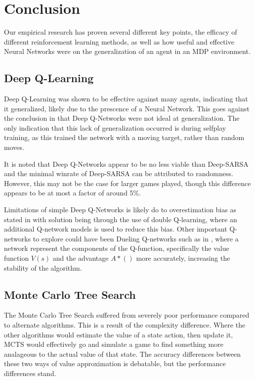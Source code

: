 \section{Conclusion}
Our empirical research has proven several different key points, the efficacy of different reinforcement learning methods, as well as how useful and effective Neural Networks were on the generalization of an agent in an MDP environment.
\subsection{Deep Q-Learning}
Deep Q-Learning was shown to be effective against many agents, indicating that it generalized, likely due to the prescence of a Neural Network. This goes against the conclusion in \citet{ree13} that Deep Q-Networks were not ideal at generalization. The only indication that this lack of generalization occurred is during selfplay training, as this trained the network with a moving target, rather than random moves.

It is noted that Deep Q-Networks appear to be no less viable than Deep-SARSA and the minimal winrate of Deep-SARSA can be attributed to randomness. However, this may not be the case for larger games played, though this difference appears to be at most a factor of around 5\%.

Limitations of simple Deep Q-Networks is likely do to overestimation bias as stated in \citet{8939117} with solution being through the use of double Q-learning, where an additional Q-network models is used to reduce this bias. Other important Q-networks to explore could have been Dueling Q-networks such as in \citet{DBLP:journals/corr/abs-2106-14642}, where a network represent the components of the Q-function, specifically the value function $V(s)$ and the advantage $A*()$ more accurately, increasing the stability of the algorithm.

\subsection{Monte Carlo Tree Search}

The Monte Carlo Tree Search suffered from severely poor performance compared to alternate algorithms. This is a result of the complexity difference. Where the other algorithms would estimate the value of a state action, then update it, MCTS would effectively go and simulate a game to find something more analageous to the actual value of that state. The accuracy differences between these two ways of value approximation is debatable, but the performance differences stand.

